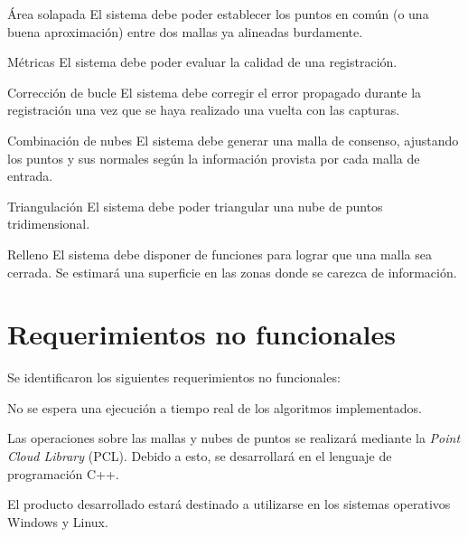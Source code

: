 	\Requerimiento
		{Área solapada}
		{El sistema debe poder establecer los puntos en común (o una buena
		aproximación) entre dos mallas ya alineadas burdamente.}

	\Requerimiento
		{Métricas}
		{El sistema debe poder evaluar la calidad de una registración.}

	\Requerimiento
		{Corrección de bucle}
		{El sistema debe corregir el error propagado durante la registración
		una vez que se haya realizado una vuelta con las capturas.}

	\Requerimiento
		{Combinación de nubes}
		{El sistema debe generar una malla de consenso, ajustando los puntos y sus normales
		según la información provista por cada malla de entrada.}

	\Requerimiento
		{Triangulación}
		{El sistema debe poder triangular una nube de puntos tridimensional.}

	\Requerimiento
		{Relleno}
		{El sistema debe disponer de funciones para lograr que una malla sea cerrada. Se
		estimará una superficie en las zonas donde se carezca de
		información.}

\section{Requerimientos no funcionales}
	Se identificaron los siguientes requerimientos no funcionales:

	{No se espera una ejecución a tiempo real de los algoritmos implementados.}

	{Las operaciones sobre las mallas y nubes de puntos se realizará
	mediante la \emph{Point Cloud Library} (PCL).
	Debido a esto, se desarrollará en el lenguaje de programación C++.}


	{El producto desarrollado estará destinado a utilizarse en los sistemas
	operativos Windows y Linux.}
